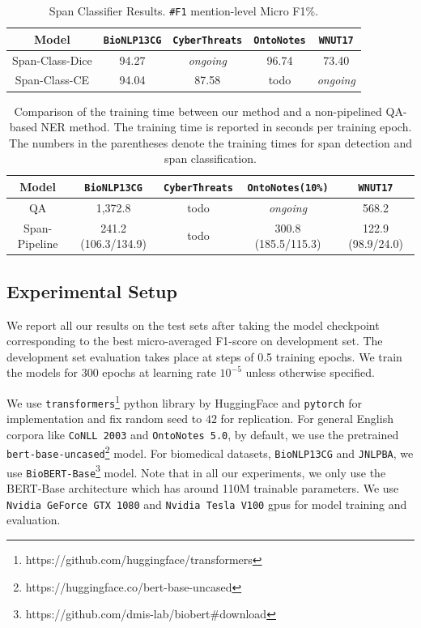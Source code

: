 \begin{table}[h!]
\centering
\begin{small}
\begin{tabular}{ccccc}\toprule
 \textbf{Model} & \texttt{BioNLP13CG} & \texttt{CyberThreats} & \texttt{OntoNotes} & \texttt{WNUT17} \\ \toprule 
Span-Class-Dice & 94.27 & \textit{ongoing} &  96.74 & 73.40  \\
Span-Class-CE     & 94.04 & 87.58 & todo & \textit{ongoing}  \\
\bottomrule
\end{tabular}
\caption{Span Classifier Results. \texttt{\#F1} mention-level Micro F1\%.}
\label{tab:class_ablation}
\end{small}
\end{table}

\begin{table}[h!]
\centering
\begin{small}
\begin{tabular}{ccccc}\toprule
 \textbf{Model} & \texttt{BioNLP13CG} & \texttt{CyberThreats} & \texttt{OntoNotes(10\%)} & \texttt{WNUT17} \\ \toprule 
QA                & 1,372.8 & todo & \textit{ongoing}  & 568.2\\
Span-Pipeline     & 241.2 (106.3/134.9) & todo & 300.8 (185.5/115.3)  & 122.9 (98.9/24.0)\\
\bottomrule
\end{tabular}
\caption{Comparison of the training time between our method and a non-pipelined QA-based NER method. 
    The training time is reported in seconds per training epoch. The numbers in the parentheses denote the training times for span detection and span classification. }
\label{tab:train_time_ablation}
\end{small}
\end{table}

\subsection{Experimental Setup}
We report all our results on the test sets after taking the model checkpoint corresponding to the best micro-averaged F1-score on development set. The development set evaluation takes place at steps of 0.5 training epochs. We train the models for $300$ epochs at learning rate $10^{-5}$ unless otherwise specified.

We use \texttt{transformers}\footnote{https://github.com/huggingface/transformers} python library by HuggingFace and \texttt{pytorch} for implementation and fix random seed to $42$ for replication. For general English corpora like \texttt{CoNLL 2003} and \texttt{OntoNotes 5.0}, by default, we use the pretrained \texttt{bert-base-uncased}\footnote{https://huggingface.co/bert-base-uncased} model. For biomedical datasets, \texttt{BioNLP13CG} and \texttt{JNLPBA}, we use \texttt{BioBERT-Base}\footnote{https://github.com/dmis-lab/biobert\#download} model. Note that in all our experiments, we only use the BERT-Base architecture which has around 110M trainable parameters. We use \texttt{Nvidia GeForce GTX 1080} and \texttt{Nvidia Tesla V100} gpus for model training and evaluation.

